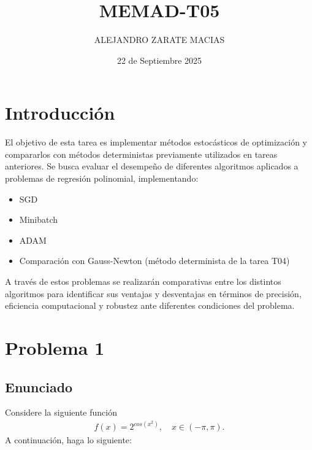 \documentclass{article}
\title{MEMAD-T05}
\author{ALEJANDRO ZARATE MACIAS}
\date{22 de Septiembre 2025}
\begin{document}
\maketitle

\section*{Introducción}

El objetivo de esta tarea es implementar métodos estocásticos de optimización y compararlos con métodos deterministas previamente utilizados en tareas anteriores. Se busca evaluar el desempeño de diferentes algoritmos aplicados a problemas de regresión polinomial, implementando:

\begin{itemize}
    \item SGD
    \item Minibatch
    \item ADAM
    \item Comparación con Gauss-Newton (método determinista de la tarea T04)
\end{itemize}

A través de estos problemas se realizarán comparativas entre los distintos algoritmos para identificar sus ventajas y desventajas en términos de precisión, eficiencia computacional y robustez ante diferentes condiciones del problema.

\section{Problema 1}

\subsection{Enunciado}

Considere la siguiente función
\begin{align*}
    f(x) = 2^{cos(x^2)}, \quad x \in (-\pi,\pi).
\end{align*}
A continuación, haga lo siguiente:
\end{document}
